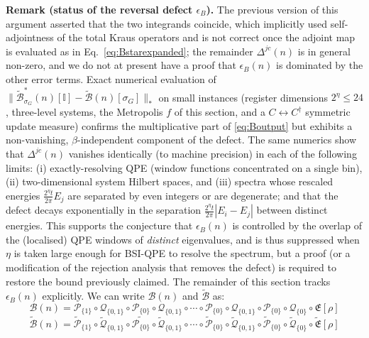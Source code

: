 \documentclass[aps,floatfix,10pt,amssymb,amsfont,amsmath,superscriptaddress,float,nofootinbib,longbibliography,nobalancelastpage,twocolumn]{revtex4-2}
\begin{document}
\begin{widetext}
\textbf{Remark (status of the reversal defect $\epsilon_B$).} The previous version of this argument asserted that the two integrands coincide, which implicitly used self-adjointness of the total Kraus operators and is not correct once the adjoint map is evaluated as in Eq.~\eqref{eq:Bstarexpanded}; the remainder $\Delta^{jc}(n)$ is in general non-zero, and we do not at present have a proof that $\epsilon_B(n)$ is dominated by the other error terms. Exact numerical evaluation of $\|\tilde{\mathcal{B}}^*_{\sigma_G}(n)[\mathbb{I}] - \tilde{\mathcal{B}}(n)[\sigma_G]\|_*$ on small instances (register dimensions $2^{\eta} \leq 24$, three-level systems, the Metropolis $f$ of this section, and a $C\leftrightarrow C^{\dagger}$ symmetric update measure) confirms the multiplicative part of \eqref{eq:Boutput} but exhibits a non-vanishing, $\beta$-independent component of the defect. The same numerics show that $\Delta^{jc}(n)$ vanishes identically (to machine precision) in each of the following limits: (i) exactly-resolving QPE (window functions concentrated on a single bin), (ii) two-dimensional system Hilbert spaces, and (iii) spectra whose rescaled energies $\frac{2^{\eta}t}{2\pi}E_j$ are separated by even integers or are degenerate; and that the defect decays exponentially in the separation $\frac{2^{\eta}t}{2\pi}|E_i - E_j|$ between distinct energies. This supports the conjecture that $\epsilon_B(n)$ is controlled by the overlap of the (localised) QPE windows of \emph{distinct} eigenvalues, and is thus suppressed when $\eta$ is taken large enough for BSI-QPE to resolve the spectrum, but a proof (or a modification of the rejection analysis that removes the defect) is required to restore the bound previously claimed. The remainder of this section tracks $\epsilon_B(n)$ explicitly.
We can write $\mathcal{B}(n)$ and $\tilde{\mathcal{B}}$ as:
\begin{equation}
    \mathcal{B}(n) = \mathcal{P}_{\{1\}}\circ\mathcal{Q}_{\{0,1\}}\circ\mathcal{P}_{\{0\}}\circ\mathcal{Q}_{\{0,1\}}\circ\cdots\circ\mathcal{P}_{\{0\}}\circ\mathcal{Q}_{\{0,1\}}\circ\mathcal{P}_{\{0\}}\circ\mathcal{Q}_{\{0\}}\circ\mathfrak{E}[\rho]
\end{equation}
\begin{equation}
    \tilde{\mathcal{B}}(n) = \tilde{\mathcal{P}}_{\{1\}}\circ\tilde {\mathcal{Q}}_{\{0,1\}}\circ\tilde{\mathcal{P}_{\{0\}}}\circ\tilde{\mathcal{Q}}_{\{0,1\}}\circ\cdots\circ\tilde{\mathcal{P}}_{\{0\}}\circ\tilde{\mathcal{Q}}_{\{0,1\}}\circ\tilde{\mathcal{P}}_{\{0\}}\circ\tilde{\mathcal{Q}}_{\{0\}}\circ\tilde{\mathfrak{E}}[\rho]

\end{equation}
\end{widetext}
\end{document}
